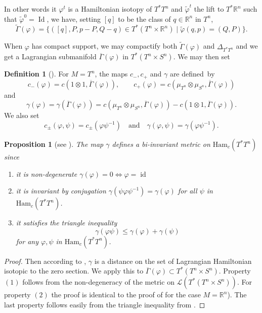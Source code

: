 \documentclass[JEP,XML,SOM,NoFloatCountersInSection,Unicode,published]{cedram}
\newcommand{\quand}{\quad\text{and}\quad}
\DeclareMathOperator{\id}{id}
\numberwithin{equation}{section}
\DeclareMathOperator{\Id}{Id}
\newcommand {\DHam}{\mathrm{Ham}}
\theoremstyle{plain}
\newtheorem{proposition}[theorem]{Proposition}
\theoremstyle{definition}
\newtheorem{definition}[theorem]{Definition}
\theoremstyle{remark}
\begin{document}
In other words it $\varphi^t$ is a Hamiltonian isotopy of $T^*T^n$ and $\widetilde \varphi^t$ the lift to $T^* {\mathbb R}^n$ such that $\widetilde \varphi^0=\Id$, we have, setting $[q]$ to be the class of $q\in {\mathbb R}^n$ in $T^n$,
\[
\widetilde \Gamma (\varphi)=\bigl\{ ([q],P, p-P,Q-q) \in T^*(T^n\times {\mathbb R}^n) \mid \widetilde \varphi(q,p)=(Q,P)\bigr\}.
\]

When $\varphi$ has compact support, we may compactify both
$\widetilde{\Gamma}(\varphi)$ and $\Delta_{T^{*}T^{n}}$ and we get a
Lagrangian submanifold $\overline\Gamma(\varphi)$ in $T^{*}(T^{n}\times
S^{n})$. We may then set

\begin{definition} [{\cite[p.\,697]{Viterbo-STAGGF}}]
For $M=T^n$, the maps $c_-,c_+$ and $\gamma$ are defined~by
\[
c_-(\varphi)=c (1\otimes 1, \overline\Gamma(\varphi)),\qquad
c_+(\varphi)=c (\mu_{T^{n}} \otimes \mu_{S^{n}}, \overline\Gamma
(\varphi))
\]
and
\[
\gamma (\varphi) = \gamma(\overline\Gamma
(\varphi))= c (\mu_{T^{n}} \otimes \mu_{S^{n}}, \overline\Gamma
(\varphi)) - c (1\otimes 1, \overline\Gamma(\varphi)).
\]
We also set
\[
c_\pm(\varphi, \psi)=c_\pm(\varphi \psi^{-1})\quand\gamma(\varphi, \psi)=\gamma (\varphi\psi^{-1}).
\]
\end{definition}

\begin{proposition}[see \cite{Viterbo-STAGGF}]\label{Prop-3.9}
The map $\gamma$ defines a bi-invariant metric on ${\DHam}_{c}(T^{*}T^n)$
since

\begin{enumerate}
\item it is non-degenerate $\gamma(\varphi)=0 \iff
\varphi = \id$
\item it is invariant by conjugation $\gamma(\psi \varphi \psi^{-1})
= \gamma(\varphi)$ for all $\psi$ in $\DHam_c(T^{*}T^n)$.
\item it satisfies the triangle inequality
\[
\gamma (\varphi\psi) \leq \gamma(\varphi)+\gamma (\psi)
\]
for any $\varphi, \psi$ in $\DHam_c(T^{*}T^n)$.
\end{enumerate}
\end{proposition}
\begin{proof}
Then according to \cite[Prop.\,2.11]{Viterbo-Montreal}, $\gamma $ is a distance on the set of Lagran\-gian
Hamiltonian isotopic to the zero section. We apply this to \hbox{$\overline\Gamma(\varphi)\!\subset\!T^*(T^n\!\times\!S^n)$}. Property $(1)$ follows from the non-degeneracy of the
metric on $\mathcal{L}(T^{*}(T^n\times S^n))$.
For property $(2)$ the proof is identical to the proof of \cite[Cor.\,4.3]{Viterbo-STAGGF} for the case \hbox{$M\!=\! {\mathbb R}^n$}).
The last property follows easily from the triangle inequality from \cite[Cor.\,3.6, p.\,696]{Viterbo-STAGGF}.
\end{proof}
\end{document}
